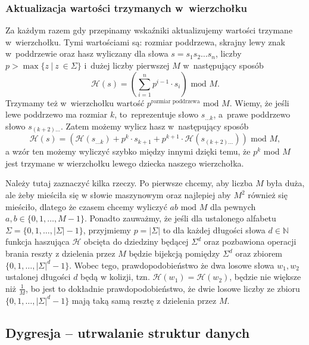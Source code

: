 \documentclass[declaration,shortabstract]{iithesis}
\theoremstyle{definition} \newtheorem{definition}{Definicja}[chapter]
\theoremstyle{plain} \newtheorem{remark}[definition]{Obserwacja}
\theoremstyle{plain} \newtheorem{theorem}[definition]{Twierdzenie}
\theoremstyle{plain} \newtheorem{example}{Przykład}[definition]
\theoremstyle{plain} \newtheorem{lemma}[definition]{Lemat}
\begin{document}
\subsubsection{Aktualizacja wartości trzymanych w~wierzchołku}

Za każdym razem gdy przepinamy wskaźniki aktualizujemy wartości trzymane w~wierzchołku. Tymi wartościami są: rozmiar poddrzewa, skrajny lewy znak w~poddrzewie oraz hasz wyliczany dla słowa $s = s_1 s_2 \ldots s_n$, liczby $p > \max \{ z\ |\ z~\in \Sigma \}$ i~dużej liczby pierwszej $M$ w~następujący sposób $$\mathcal{H}(s) = (\sum_{i=1}^n p^{i-1} \cdot s_i) \text{ mod } M.$$ Trzymamy też w~wierzchołku wartość $p^{\text{rozmiar poddrzewa}} \text{ mod } M$. Wiemy, że jeśli lewe poddrzewo ma rozmiar $k$, to~reprezentuje słowo $s_{\ldots k}$, a~prawe poddrzewo słowo $s_{(k + 2) \ldots}$. Zatem możemy wylicz hasz w~następujący sposób $$ \mathcal{H}(s) = (\mathcal{H}(s_{\ldots k}) + p^k \cdot s_{k+1} + p^{k+1} \cdot \mathcal{H}(s_{(k+2) \ldots})) \text{ mod } M,$$ a wzór ten możemy wyliczyć szybko między innymi dzięki temu, że $p^k$ mod $M$ jest trzymane w wierzchołku lewego dziecka naszego wierzchołka.

Należy tutaj zaznaczyć kilka rzeczy. Po pierwsze chcemy, aby liczba $M$ była duża, ale żeby mieściła się w słowie maszynowym oraz najlepiej aby $M^2$ również się mieściło, dlatego że czasem chcemy wyliczyć $ab \text{ mod } M$ dla pewnych $a, b \in \{0, 1, \ldots, M - 1\}$. Ponadto zauważmy, że jeśli dla ustalonego alfabetu $\Sigma = \{0, 1, \ldots, |\Sigma| - 1\}$, przyjmiemy $p = |\Sigma|$ to dla każdej długości słowa $d \in \mathbb{N}$ funkcja haszująca $\mathcal{H}$ obcięta do dziedziny będącej $\Sigma^d$ oraz pozbawiona operacji brania reszty z dzielenia przez $M$ będzie bijekcją pomiędzy $\Sigma^d$ oraz zbiorem $\{0, 1, \ldots, |\Sigma|^d - 1\}$. Wobec tego, prawdopodobieństwo że dwa losowe słowa $w_1, w_2$ ustalonej długości $d$ będą w kolizji, tzn. $\mathcal{H}(w_1) = \mathcal{H}(w_2)$, będzie nie większe niż $\frac{1}{M}$, bo jest to dokładnie prawdopodobieństwo, że dwie losowe liczby ze zbioru $\{0, 1, \ldots, |\Sigma|^d - 1\}$ mają taką samą resztę z dzielenia przez $M$.

\subsection{Dygresja -- utrwalanie struktur danych}
\end{document}

